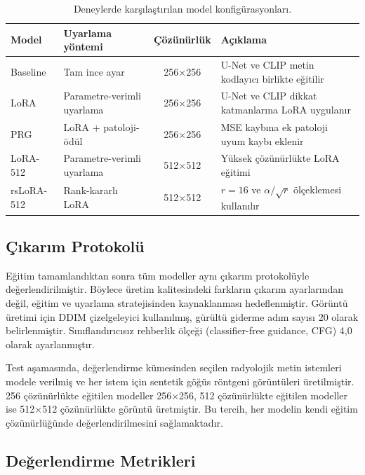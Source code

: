 \documentclass[11pt]{article}
\begin{document}
\begin{table}[htbp]
\centering
\caption{Deneylerde karşılaştırılan model konfigürasyonları.}
\label{tab:models}
\small
\begin{tabular}{@{}l l c >{\raggedright\arraybackslash}p{}@{}}
\toprule
\textbf{Model} & \textbf{Uyarlama yöntemi} & \textbf{Çözünürlük} & \textbf{Açıklama} \\
\midrule
Baseline & Tam ince ayar & 256$\times$256 &
U-Net ve CLIP metin kodlayıcı birlikte eğitilir \\

LoRA & Parametre-verimli uyarlama & 256$\times$256 &
U-Net ve CLIP dikkat katmanlarına LoRA uygulanır \\

PRG & LoRA + patoloji-ödül & 256$\times$256 &
MSE kaybına ek patoloji uyum kaybı eklenir \\

LoRA-512 & Parametre-verimli uyarlama & 512$\times$512 &
Yüksek çözünürlükte LoRA eğitimi \\

rsLoRA-512 & Rank-kararlı LoRA & 512$\times$512 &
$r=16$ ve $\alpha/\sqrt{r}$ ölçeklemesi kullanılır \\
\bottomrule
\end{tabular}
\end{table}

\subsection{Çıkarım Protokolü}

Eğitim tamamlandıktan sonra tüm modeller aynı çıkarım protokolüyle
değerlendirilmiştir. Böylece üretim kalitesindeki farkların çıkarım
ayarlarından değil, eğitim ve uyarlama stratejisinden kaynaklanması
hedeflenmiştir. Görüntü üretimi için DDIM çizelgeleyici kullanılmış, gürültü
giderme adım sayısı 20 olarak belirlenmiştir. Sınıflandırıcısız rehberlik
ölçeği (classifier-free guidance, CFG) 4,0 olarak ayarlanmıştır.

Test aşamasında, değerlendirme kümesinden seçilen radyolojik metin istemleri
modele verilmiş ve her istem için sentetik göğüs röntgeni görüntüleri
üretilmiştir. 256 çözünürlükte eğitilen modeller 256$\times$256, 512
çözünürlükte eğitilen modeller ise 512$\times$512 çözünürlükte görüntü
üretmiştir. Bu tercih, her modelin kendi eğitim çözünürlüğünde
değerlendirilmesini sağlamaktadır.

\subsection{Değerlendirme Metrikleri}
\end{document}
